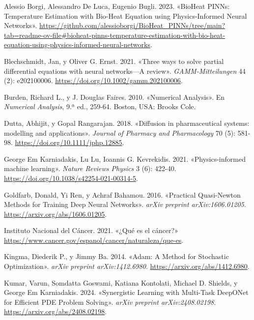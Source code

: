 \documentclass[
  spanish,
  us-letterpaper,
]{scrreprt}
\newlength{\cslhangindent}
\newenvironment{CSLReferences}[2] %
 {\begin{list}{}{%
  \setlength{\itemindent}{0pt}
  \setlength{\leftmargin}{0pt}
  \setlength{\parsep}{0pt}
  \ifodd #1
   \setlength{\leftmargin}{\cslhangindent}
   \setlength{\itemindent}{-1\cslhangindent}
  \fi
  \setlength{\itemsep}{#2\baselineskip}}}
 {\end{list}}
\theoremstyle{definition}
\theoremstyle{plain}
\theoremstyle{remark}
\begin{document}
\label{refs}
\begin{CSLReferences}{1}{0}
Alessio Borgi, Alessandro De Luca, Eugenio Bugli. 2023. {«{BioHeat
PINNs: Temperature Estimation with Bio-Heat Equation using
Physics-Informed Neural Networks}»}.
\url{https://github.com/alessioborgi/BioHeat_PINNs/tree/main?tab=readme-ov-file\#bioheat-pinns-temperature-estimation-with-bio-heat-equation-using-physics-informed-neural-networks}.

Blechschmidt, Jan, y Oliver G. Ernst. 2021. {«Three ways to solve
partial differential equations with neural networks---A review»}.
\emph{GAMM-Mitteilungen} 44 (2): e202100006.
\url{https://doi.org/10.1002/gamm.202100006}.

Burden, Richard L., y J. Douglas Faires. 2010. {«Numerical Analysis»}.
En \emph{Numerical Analysis}, 9.ª ed., 259-64. Boston, USA: Brooks Cole.

Dutta, Abhijit, y Gopal Rangarajan. 2018. {«Diffusion in pharmaceutical
systems: modelling and applications»}. \emph{Journal of Pharmacy and
Pharmacology} 70 (5): 581-98. \url{https://doi.org/10.1111/jphp.12885}.

George Em Karniadakis, Lu Lu, Ioannis G. Kevrekidis. 2021.
{«Physics-informed machine learning»}. \emph{Nature Reviews Physics} 3
(6): 422-40. \url{https://doi.org/10.1038/s42254-021-00314-5}.

Goldfarb, Donald, Yi Ren, y Achraf Bahamou. 2016. {«Practical
Quasi-Newton Methods for Training Deep Neural Networks»}. \emph{arXiv
preprint arXiv:1606.01205}. \url{https://arxiv.org/abs/1606.01205}.

Instituto Nacional del Cáncer. 2021. {«{¿Qué es el cáncer?}»}
\url{https://www.cancer.gov/espanol/cancer/naturaleza/que-es}.

Kingma, Diederik P., y Jimmy Ba. 2014. {«Adam: A Method for Stochastic
Optimization»}. \emph{arXiv preprint arXiv:1412.6980}.
\url{https://arxiv.org/abs/1412.6980}.

Kumar, Varun, Somdatta Goswami, Katiana Kontolati, Michael D. Shields, y
George Em Karniadakis. 2024. {«Synergistic Learning with Multi-Task
DeepONet for Efficient PDE Problem Solving»}. \emph{arXiv preprint
arXiv:2408.02198}. \url{https://arxiv.org/abs/2408.02198}.


\end{CSLReferences}
\end{document}
